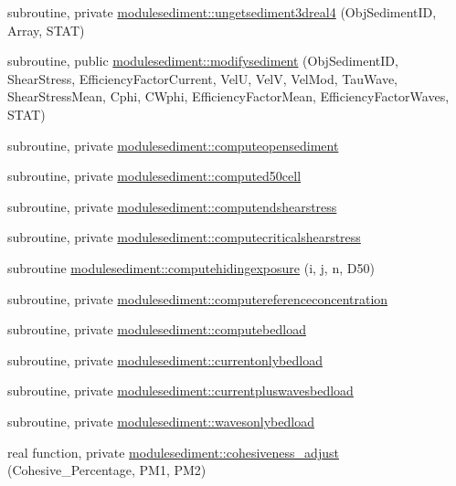 \begin{DoxyCompactItemize}
subroutine, private \mbox{\hyperlink{namespacemodulesediment_aa228482586fe3192bde62eb98f474300}{modulesediment\+::ungetsediment3dreal4}} (Obj\+Sediment\+ID, Array, S\+T\+AT)
\item 
subroutine, public \mbox{\hyperlink{namespacemodulesediment_a8bd56ac218e3c51dd03eb2967d7e9398}{modulesediment\+::modifysediment}} (Obj\+Sediment\+ID, Shear\+Stress, Efficiency\+Factor\+Current, VelU, VelV, Vel\+Mod, Tau\+Wave, Shear\+Stress\+Mean, Cphi, C\+Wphi, Efficiency\+Factor\+Mean, Efficiency\+Factor\+Waves, S\+T\+AT)
\item 
subroutine, private \mbox{\hyperlink{namespacemodulesediment_a3b7a3bb199cbac91d1df5c84bbd12194}{modulesediment\+::computeopensediment}}
\item 
subroutine, private \mbox{\hyperlink{namespacemodulesediment_ad32ebe12f24cd2680e47efaeaf5c8e56}{modulesediment\+::computed50cell}}
\item 
subroutine, private \mbox{\hyperlink{namespacemodulesediment_a9d78e985794a27f527367cd42c5dafb2}{modulesediment\+::computendshearstress}}
\item 
subroutine, private \mbox{\hyperlink{namespacemodulesediment_a04e890023555f00803b6373c6f8934cc}{modulesediment\+::computecriticalshearstress}}
\item 
subroutine \mbox{\hyperlink{namespacemodulesediment_a03f094fcbc01dd75c60a5a69ce5dde19}{modulesediment\+::computehidingexposure}} (i, j, n, D50)
\item 
subroutine, private \mbox{\hyperlink{namespacemodulesediment_ab4eb31a619673958de47a8eb42ca39fa}{modulesediment\+::computereferenceconcentration}}
\item 
subroutine, private \mbox{\hyperlink{namespacemodulesediment_a621ed127ad378409a67e67c54993d3cb}{modulesediment\+::computebedload}}
\item 
subroutine, private \mbox{\hyperlink{namespacemodulesediment_a099f230f690695fa4061449e8880d0e7}{modulesediment\+::currentonlybedload}}
\item 
subroutine, private \mbox{\hyperlink{namespacemodulesediment_ab4e81d1c3c2244f9bb0f378491adbc1e}{modulesediment\+::currentpluswavesbedload}}
\item 
subroutine, private \mbox{\hyperlink{namespacemodulesediment_ab75ac0182e2b11a8063dbb8027fa8d19}{modulesediment\+::wavesonlybedload}}
\item 
real function, private \mbox{\hyperlink{namespacemodulesediment_afbd767a170502bf18b5849039940895d}{modulesediment\+::cohesiveness\+\_\+adjust}} (Cohesive\+\_\+\+Percentage, P\+M1, P\+M2)

\end{DoxyCompactItemize}

